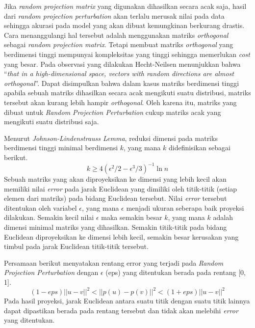 \documentclass[a4paper,twoside]{article}
\begin{document}
\begin{enumerate}
		Jika \textit{random projection matrix} yang digunakan dihasilkan secara acak saja, hasil dari \textit{random projection perturbation} akan terlalu merusak nilai pada data sehingga akurasi pada model yang akan dibuat kemungkinan berkurang drastis. Cara menanggulangi hal tersebut adalah menggunakan matriks \textit{orthogonal} sebagai \textit{random projection matrix}. Tetapi membuat matriks \textit{orthogonal} yang berdimensi tinggi mempunyai kompleksitas yang tinggi sehingga memerlukan \textit{cost} yang besar. Pada observasi yang dilakukan Hecht-Neilsen menunjukkan bahwa “\textit{that in a high-dimensional space, vectors with random directions are almost orthogonal}”. Dapat disimpulkan bahwa dalam kasus matriks berdimensi tinggi apabila sebuah matriks dihasilkan secara acak mengikuti suatu distribusi, matriks tersebut akan kurang lebih hampir \textit{orthogonal}. Oleh karena itu, matriks yang dibuat untuk \textit{Random Projection Perturbation} cukup matriks acak yang mengikuti suatu distribusi saja.
		
		Menurut \textit{Johnson-Lindenstrauss Lemma}, reduksi dimensi pada matriks berdimensi tinggi minimal berdimensi \(k\), yang mana \(k\) didefinisikan sebagai berikut.
		\begin{equation}
			k \geq 4(\epsilon^{2}/2-\epsilon^{3}/3)^{-1}\ln{n}
		\end{equation}
		Sebuah matriks yang akan diproyeksikan ke dimensi yang lebih kecil akan memiliki nilai \textit{error} pada jarak Euclidean yang dimiliki oleh titik-titik (setiap elemen dari matriks) pada bidang Euclidean tersebut. Nilai \textit{error} tersebut ditentukan oleh variabel \(\epsilon\), yang mana \(\epsilon\) menjadi ukuran seberapa baik proyeksi dilakukan. Semakin kecil nilai \(\epsilon\) maka semakin besar \(k\), yang mana \(k\) adalah dimensi minimal matriks yang dihasilkan. Semakin titik-titik pada bidang Euclidean diproyeksikan ke dimensi lebih kecil, semakin besar kerusakan yang timbul pada jarak Euclidean titik-titik tersebut.
		
		Persamaan berikut menyatakan rentang error yang terjadi pada \textit{Random Projection Perturbation} dengan \(\epsilon\) (eps) yang ditentukan berada pada rentang [0, 1]. 
		\begin{equation}
			(1-eps)||u - v||^{2}<||p(u) - p(v)||^{2}<(1+eps)||u - v||^{2}
		\end{equation}
		Pada hasil proyeksi, jarak Euclidean antara suatu titik dengan suatu titik lainnya dapat dipastikan berada pada rentang tersebut dan tidak akan melebihi \textit{error} yang ditentukan.		


\end{enumerate}
\end{document}
